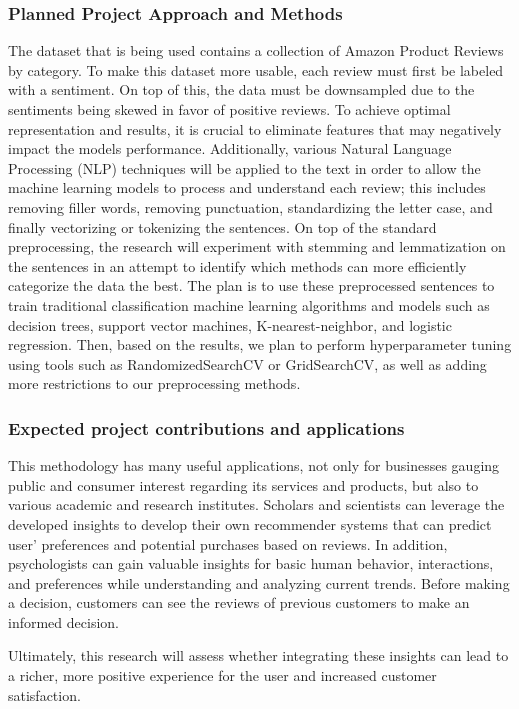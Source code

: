 \documentclass[stu,12pt,floatsintext]{apa7}
\begin{document}
\subsubsection{Planned Project Approach and Methods}
The dataset that is being used contains a collection of Amazon Product Reviews by category. To make this dataset more usable, each review must first be labeled with a sentiment. On top of this, the data must be downsampled due to the sentiments being skewed in favor of positive reviews. To achieve optimal representation and results, it is crucial to eliminate features that may negatively impact the models performance. Additionally, various Natural Language Processing (NLP) techniques will be applied to the text in order to allow the machine learning models to process and understand each review; this includes removing filler words, removing punctuation, standardizing the letter case, and finally vectorizing or tokenizing the sentences. On top of the standard preprocessing, the research will experiment with stemming and lemmatization on the sentences in an attempt to identify which methods can more efficiently categorize the data the best. The plan is to use these preprocessed sentences to train traditional classification machine learning algorithms and models such as decision trees, support vector machines, K-nearest-neighbor, and logistic regression. Then, based on the results, we plan to perform hyperparameter tuning using tools such as RandomizedSearchCV or GridSearchCV, as well as adding more restrictions to our preprocessing methods.

\subsubsection{Expected project contributions and applications}
This methodology has many useful applications, not only for businesses gauging public and consumer interest regarding its services and products, but also to various academic and research institutes. Scholars and scientists can leverage the developed insights to develop their own recommender systems that can predict user’ preferences and potential purchases based on reviews. In addition, psychologists can gain valuable insights for basic human behavior, interactions, and preferences while understanding and analyzing current trends. Before making a decision, customers can see the reviews of previous customers to make an informed decision. 

Ultimately, this research will assess whether integrating these insights can lead to a richer, more positive experience for the user and increased customer satisfaction. 
\end{document}
